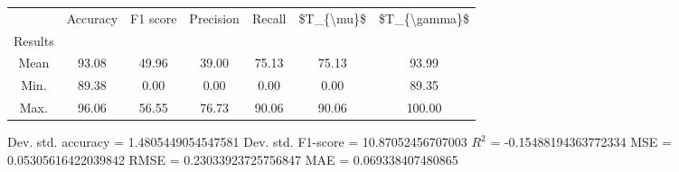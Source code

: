 \begin{tabular}{|c|c|c|c|c|c|c|}
\toprule
{} &  Accuracy &  F1 score &  Precision &  Recall &  \$T\_\{\textbackslash mu\}\$ &  \$T\_\{\textbackslash gamma\}\$ \\
Results &           &           &            &         &            &               \\
\hline
Mean    &     93.08 &     49.96 &      39.00 &   75.13 &      75.13 &         93.99 \\
Min.    &     89.38 &      0.00 &       0.00 &    0.00 &       0.00 &         89.35 \\
Max.    &     96.06 &     56.55 &      76.73 &   90.06 &      90.06 &        100.00 \\
\bottomrule
\end{tabular}

 Dev. std. accuracy = 1.4805449054547581
 Dev. std. F1-score = 10.87052456707003
 $R^2$ = -0.15488194363772334
 MSE = 0.05305616422039842
 RMSE = 0.23033923725756847
 MAE = 0.069338407480865